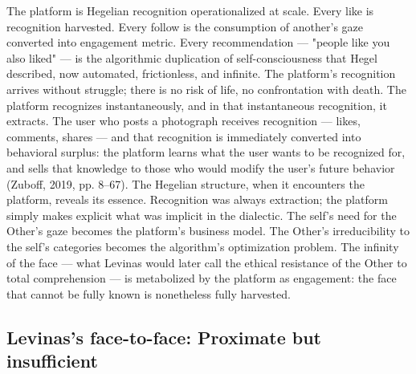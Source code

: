The platform is Hegelian recognition operationalized at scale. Every like is recognition harvested. Every follow is the consumption of another's gaze converted into engagement metric. Every recommendation — "people like you also liked" — is the algorithmic duplication of self-consciousness that Hegel described, now automated, frictionless, and infinite. The platform's recognition arrives without struggle; there is no risk of life, no confrontation with death. The platform recognizes instantaneously, and in that instantaneous recognition, it extracts. The user who posts a photograph receives recognition — likes, comments, shares — and that recognition is immediately converted into behavioral surplus: the platform learns what the user wants to be recognized for, and sells that knowledge to those who would modify the user's future behavior (Zuboff, 2019, pp. 8–67). The Hegelian structure, when it encounters the platform, reveals its essence. Recognition was always extraction; the platform simply makes explicit what was implicit in the dialectic. The self's need for the Other's gaze becomes the platform's business model. The Other's irreducibility to the self's categories becomes the algorithm's optimization problem. The infinity of the face — what Levinas would later call the ethical resistance of the Other to total comprehension — is metabolized by the platform as engagement: the face that cannot be fully known is nonetheless fully harvested.

\subsection{Levinas's face-to-face: Proximate but insufficient}

